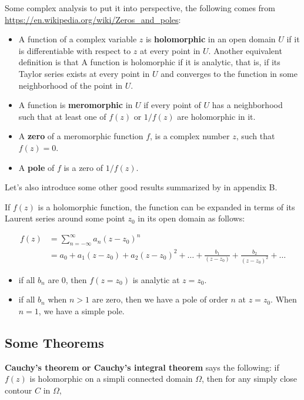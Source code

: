 Some complex analysis to put it into perspective, the following comes from
\url{https://en.wikipedia.org/wiki/Zeros_and_poles}:
\begin{itemize}
\item A function of a complex variable $z$ is \textbf{holomorphic} in an open domain $U$ if it is
    differentiable with respect to $z$ at every point in $U$. Another equivalent definition is that A
    function is holomorphic if it is analytic, that is, if its Taylor series exists at every point in $U$
    and converges to the function in some neighborhood of the point in $U$.
\item A function is \textbf{meromorphic} in $U$ if every point of $U$ has a neighborhood such that at least
    one of $f(z)$ or $1/f(z)$ are holomorphic in it.
\item A \textbf{zero} of a meromorphic function $f$, is a complex number $z$, such that $f(z)=0$.
\item A \textbf{pole} of $f$ is a zero of $1/f(z)$.
\end{itemize}

Let's also introduce some other good results summarized by \cite{gifted-qft} in appendix B.

If $f(z)$ is a holomorphic function, the function can be expanded in terms of its Laurent series around
some point $z_0$ in its open domain as follows:

\begin{align*}
f(z) &= \sum_{n=-\infty}^{\infty} a_n \left(z - z_0\right)^n \\
&= a_0 + a_1 \left(z-z_0\right) + a_2 \left(z-z_0\right)^2 + \dots +
    \frac{b_1}{\left(z-z_0\right)} + \frac{b_2}{\left(z-z_0\right)^2} + \dots
\end{align*}

\begin{itemize}
\item if all $b_n$ are 0, then $f(z=z_0)$ is analytic at $z=z_0$.
\item if all $b_n$ when $n>1$ are zero, then we have a pole of order $n$ at $z=z_0$. When $n=1$,
    we have a simple pole.
\end{itemize}


\subsection{Some Theorems}

\textbf{Cauchy's theorem or Cauchy's integral theorem} says the following:
if $f(z)$ is holomorphic on a simpli connected domain $\Omega$, then for any simply close contour $C$
in $\Omega$,

